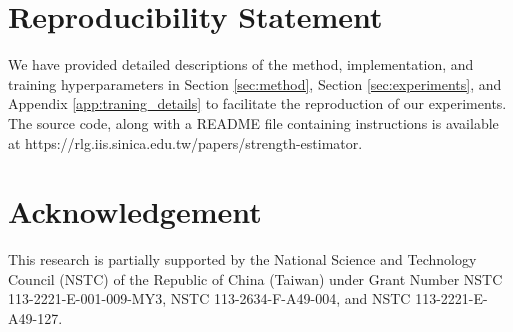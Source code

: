 
\section*{Reproducibility Statement}
\label{sec:reproducibility}

We have provided detailed descriptions of the method, implementation, and training hyperparameters in Section \ref{sec:method}, Section \ref{sec:experiments}, and Appendix \ref{app:traning_details} to facilitate the reproduction of our experiments.
The source code, along with a README file containing instructions is available at https://rlg.iis.sinica.edu.tw/papers/strength-estimator.

\section*{Acknowledgement}
This research is partially supported by the National Science and Technology Council (NSTC) of the Republic of China (Taiwan) under Grant Number NSTC 113-2221-E-001-009-MY3, NSTC 113-2634-F-A49-004, and NSTC 113-2221-E-A49-127.